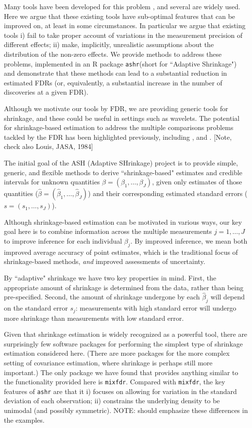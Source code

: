 \documentclass[11pt]{article}
\def\bhat{\hat{\beta}}
\def\mixfdr{{\tt mixfdr}\xspace}
\def\ashr{{\tt ashr}\xspace}
\begin{document}
Many tools have been developed for this problem \cite{}, and several are widely used.
Here we argue that these existing tools have sub-optimal features that can be improved on, at least in some circumstances.
In particular we argue that existing tools i) fail to take proper account of variations in the measurement precision of different effects;
ii) make, implicitly, unrealistic assumptions about the distribution of the non-zero effects. We provide methods
to address these problems, implemented in an R package \ashr (short for ``Adaptive Shrinkage") and demonstrate that these methods can lead to a substantial reduction in estimated FDRs (or, equivalently,
a substantial increase in the number of discoveries at a given FDR).  

Although we motivate our tools by FDR, we are providing generic tools for shrinkage, and
these could be useful in settings such as wavelets.
The potential for shrinkage-based estimation to
address the multiple comparisons problems tackled by the FDR
has been highlighted
previously, including \cite{greenland1991empirical},
\cite{efron2008microarrays} and \cite{gelman2012we}. [Note, check also Louis, JASA, 1984] 


The initial goal of the ASH (Adaptive SHrinkage) project is to provide simple, generic, and flexible methods to derive ``shrinkage-based" estimates and credible intervals for unknown quantities $\beta=(\beta_1,\dots,\beta_J)$, given only estimates of those quantities ($\bhat=(\bhat_1,\dots, \bhat_J)$) and their corresponding estimated standard errors ($s=(s_1,\dots,s_J)$). 

Although shrinkage-based estimation can be motivated in various ways, our key goal here is to combine information across the multiple measurements $j=1,\dots,J$ to improve inference for each individual $\beta_j$. By improved inference, we mean both
improved average accuracy of point estimates, which is
the traditional focus of shrinkage-based methods, \emph{and} improved assessments of uncertainty. 

By ``adaptive" shrinkage we 
have two key properties in mind. First, the appropriate amount of shrinkage is determined from the data, rather than being pre-specified. Second, the amount of shrinkage undergone by each $\bhat_j$ will depend on the standard error $s_j$: measurements with high standard error will undergo more shrinkage than measurements with low standard error.

Given that shrinkage estimation is widely recognized as a powerful tool, there are surprisingly few software packages for performing the simplest type of shrinkage estimation considered here. (There are more packages for the more complex setting of covariance estimation, where shrinkage is perhaps still more important.)
The only package we have found that provides anything similar
to the functionality provided here is \mixfdr \cite{muralidharan2010empirical}. Compared with \mixfdr, the key features of \ashr are that it
i) focuses on allowing for variation in the standard deviation of each observation; ii) constrains the underlying density to be unimodal (and possibly symmetric).
NOTE: should emphasize these differences in the examples.
\end{document}
